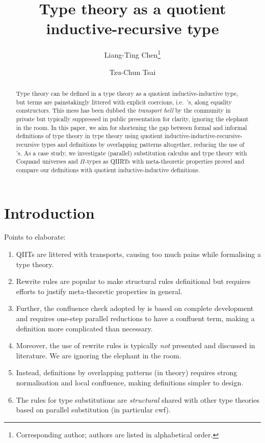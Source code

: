 \documentclass[a4paper,UKenglish,numberwithinsect,cleveref,thm-restate]{lipics-v2021}
\title{Type theory as a quotient inductive-recursive type}
\author{Liang-Ting Chen\footnote{Corresponding author; authors are listed in alphabetical order.}}{Institute of Information Science, Academia Sinica, Taiwan \and \url{http://l-tchen.github.io}}{ltchen@iis.sinica.edu.tw}{https://orcid.org/0000-0002-3250-1331}{Supported by the National Science and Technology Council of Taiwan under grant NSTC [funding].}
\author{Tzu-Chun Tsai}{Institute of Information Science, Academia Sinica, Taiwan}{gene0905@icloud.com}{}{Supported by the National Science and Technology Council of Taiwan under grant NSTC 112-2221-E-001-003-MY3.}
\begin{document}
\maketitle

\begin{abstract}
  Type theory can be defined in a type theory as a quotient inductive-inductive type, but terms are painstakingly littered with explicit coercions, i.e.\ \transp's, along equality constructors.
  This mess has been dubbed the \emph{transport hell} by the community in private but typically suppressed in public presentation for clarity, ignoring the elephant in the room.
  In this paper, we aim for shortening the gap between formal and informal definitions of type theory in type theory using quotient inductive-inductive-recursive-recursive types and definitions by overlapping patterns altogether, reducing the use of \transp's.
  As a case study, we investigate (parallel) substitution calculus and type theory with Coquand universes and $\Pi$-types as QIIRTs with meta-theoretic properties proved and compare our definitions with quotient inductive-inductive definitions.
\end{abstract}

\section{Introduction} \label{sec:intro}
Points to elaborate:
\begin{enumerate}
  \item QIITs are littered with transports, causing too much pains while formalising a type theory.
  \item Rewrite rules are popular to make structural rules definitional but requires efforts to justify meta-theoretic properties in general.
  \item Further, the confluence check adopted by \Agda is based on complete development and requires one-step parallel reductions to have a confluent term, making a definition more complicated than necessary.
  \item Moreover, the use of rewrite rules is typically \emph{not} presented and discussed in literature. We are ignoring the elephant in the room.
  \item Instead, definitions by overlapping patterns (in theory) requires strong normalisation and local confluence, making definitions simpler to design.
  \item The rules for type substitutions are \emph{structural} shared with other type theories based on parallel substitution (in particular cwf).
  
\end{enumerate}
\end{document}
